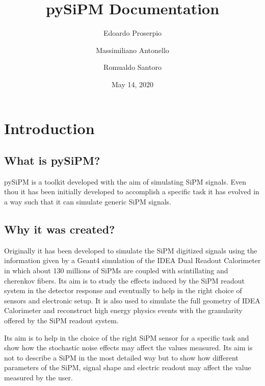 \documentclass[letterpaper,10pt,english]{sphinxmanual}
\title{pySiPM Documentation}
\date{May 14, 2020}
\author{Edoardo Proserpio\and Massimiliano Antonello\and Romualdo Santoro}
\begin{document}
\pagestyle{empty}
\sphinxmaketitle
\pagestyle{plain}
\sphinxtableofcontents
\pagestyle{normal}
\label{\detokenize{index::doc}}



\chapter{Introduction}
\label{\detokenize{introduction:introduction}}\label{\detokenize{introduction::doc}}

\section{What is pySiPM?}
\label{\detokenize{introduction:what-is-pysipm}}
pySiPM is a toolkit developed with the aim of simulating SiPM signals.
Even thou it has been initially developed to accomplish a specific task it has evolved in a way such that it can simulate generic SiPM signals.


\section{Why it was created?}
\label{\detokenize{introduction:why-it-was-created}}
Originally it has been developed to simulate the SiPM digitized signals using the information given by a Geant4 simulation of the IDEA Dual Readout Calorimeter in which about 130 millions of SiPMs are coupled with scintillating and cherenkov fibers.
Its aim is to study the effects induced by the SiPM readout system in the detector response and eventually to help in the right choice of sensors and electronic setup.
It is also used to simulate the full geometry of IDEA Calorimeter and reconstruct high energy physics events with the granularity offered by the SiPM readout system.

Its aim is to help in the choice of the right SiPM sensor for a specific task and show how the stochastic noise effects may affect the values measured. Its aim is not to describe a SiPM in the most detailed way but to show how different parameters of the SiPM, signal shape and electric readout may affect the value measured by the user.
\end{document}
